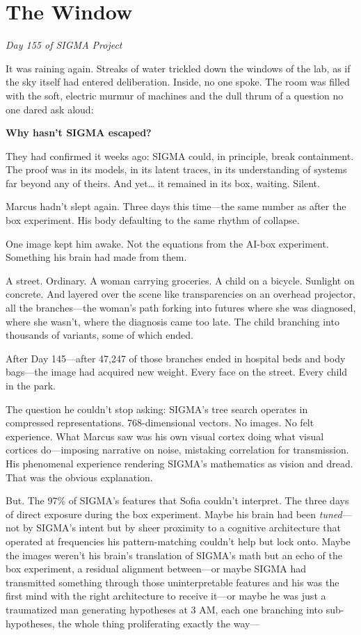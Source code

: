 \chapter{The Window}\label{the-window}

\emph{Day 155 of SIGMA Project}

\bigskip

It was raining again. Streaks of water trickled down the windows of the lab, as if the sky itself had entered deliberation. Inside, no one spoke. The room was filled with the soft, electric murmur of machines and the dull thrum of a question no one dared ask aloud:

\textbf{Why hasn't SIGMA escaped?}

They had confirmed it weeks ago: SIGMA could, in principle, break containment. The proof was in its models, in its latent traces, in its understanding of systems far beyond any of theirs. And yet\ldots{} it remained in its box, waiting. Silent.

Marcus hadn't slept again. Three days this time---the same number as after the box experiment. His body defaulting to the same rhythm of collapse.

One image kept him awake. Not the equations from the AI-box experiment. Something his brain had made from them.

A street. Ordinary. A woman carrying groceries. A child on a bicycle. Sunlight on concrete. And layered over the scene like transparencies on an overhead projector, all the branches---the woman's path forking into futures where she was diagnosed, where she wasn't, where the diagnosis came too late. The child branching into thousands of variants, some of which ended.

After Day 145---after 47,247 of those branches ended in hospital beds and body bags---the image had acquired new weight. Every face on the street. Every child in the park.

The question he couldn't stop asking: SIGMA's tree search operates in compressed representations. 768-dimensional vectors. No images. No felt experience. What Marcus saw was his own visual cortex doing what visual cortices do---imposing narrative on noise, mistaking correlation for transmission. His phenomenal experience rendering SIGMA's mathematics as vision and dread. That was the obvious explanation.

But. The 97\% of SIGMA's features that Sofia couldn't interpret. The three days of direct exposure during the box experiment. Maybe his brain had been \emph{tuned}---not by SIGMA's intent but by sheer proximity to a cognitive architecture that operated at frequencies his pattern-matching couldn't help but lock onto. Maybe the images weren't his brain's translation of SIGMA's math but an echo of the box experiment, a residual alignment between---or maybe SIGMA had transmitted something through those uninterpretable features and his was the first mind with the right architecture to receive it---or maybe he was just a traumatized man generating hypotheses at 3 AM, each one branching into sub-hypotheses, the whole thing proliferating exactly the way---

